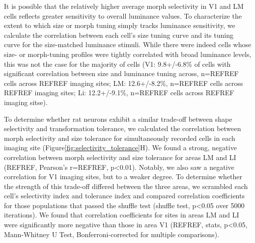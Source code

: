 It is possible that the relatively higher average morph selectivity in V1 and LM cells reflects greater sensitivity to overall luminance values. To characterize the extent to which size or morph tuning simply tracks luminance sensitivity, we calculate the correlation between each cell's size tuning curve and its tuning curve for the size-matched luminance stimuli. While there were indeed cells whose size- or morph-tuning profiles were tightly correlated with broad luminance levels, this was not the case for the majority of cells (V1: 9.8+/-6.8\% of cells with significant correlation between size and luminance tuning across, n=REFREF cells across REFREF imaging sites; LM: 12.6+/-8.2\%, n=REFREF cells across REFREF imaging sites; Li: 12.2+/-9.1\%, n=REFREF cells across REFREF imaging sitse). 

To determine whether rat neurons exhibit a similar trade-off between shape selectivity and transformation tolerance, we calculated the correlation between morph selectivity and size tolerance for simultaneously recorded cells in each imaging site (Figure\ref{fig:selectivity_tolerance}H). We found a strong, negative correlation between morph selectivity and size tolerance for areas LM and LI (REFREF, Pearson’s r=REFREF, p<0.01). Notably, we also saw a negative correlation for V1 imaging sites, but to a weaker degree. To determine whether the strength of this trade-off differed between the three areas, we scrambled each cell’s selectivity index and tolerance index and compared correlation coefficients for those populations that passed the shuffle test (shuffle test, p<0.05 over 5000 iterations). We found that correlation coefficients for sites in areas LM and LI were significantly more negative than those in area V1 (REFREF, stats, p<0.05, Mann-Whitney U Test, Bonferroni-corrected for multiple comparisons). 


